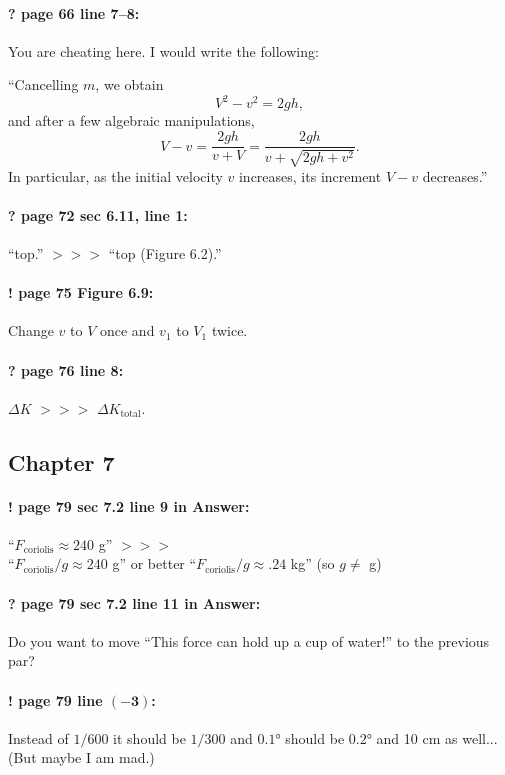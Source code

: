 \documentclass[twoside]{article}
\begin{document}
\paragraph{? page 66 line 7--8:} You are cheating here. I would write the following:

``Cancelling $m$, we obtain
\[
V^2 - v^2 = 2gh,
\]
and after a few algebraic manipulations,
\[
V - v = \frac{2gh}{v+V} = \frac{2gh}{v+\sqrt{2gh+v^2}}.
\]
In particular, as the initial velocity $v$ increases, its increment $V - v$ decreases.''

\paragraph{? page 72 sec 6.11, line 1:} ``top.'' $>\!>\!>$  ``top (Figure 6.2).''

\paragraph{! page 75 Figure 6.9:} Change $v$ to $V$ once and $v_1$ to $V_1$ twice.

\paragraph{? page 76 line 8:} $\Delta K$ $>\!>\!>$ $\Delta K_{\mathrm{total}}$.

\subsection*{Chapter 7}

\paragraph{! page 79 sec 7.2 line 9 in Answer:}
``$F_{\mathrm{coriolis}}\approx 240$ g'' $>\!>\!>$
\\
``$F_{\mathrm{coriolis}}/g\approx 240$ g'' or better ``$F_{\mathrm{coriolis}}/g\approx .24$ kg'' (so $g\ne$ g)

\paragraph{? page 79 sec 7.2 line 11 in Answer:} Do you want to move ``This force can hold up a cup of water!'' to the previous par?

\paragraph{! page 79 line $\bm{(-3)}$:} Instead of $1/600$ it should be $1/300$ and $0{.}1$° should be $0{.}2$° and 10 cm as well... (But maybe I am mad.)
\end{document}
